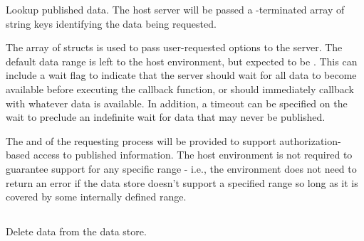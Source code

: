 
\optattrend


\descr

Lookup published data.
The host server will be passed a -terminated array of string keys identifying the data being requested.

The array of  structs is used to pass user-requested options to the server. The default data range is left to the host environment, but expected to be .
This can include a wait flag to indicate that the server should wait for all data to become available before executing the callback function, or should immediately callback with whatever data is available.
In addition, a timeout can be specified on the wait to preclude an indefinite wait for data that may never be published.

\advicermstart
The  and  of the requesting process will be provided to support authorization-based access to published information. The host environment is not required to guarantee support for any specific range - i.e., the environment does not need to return an error if the data store doesn't support a specified range so long as it is covered by some internally defined range.
\advicermend

\subsection{}

\summary

Delete data from the data store.

\format



